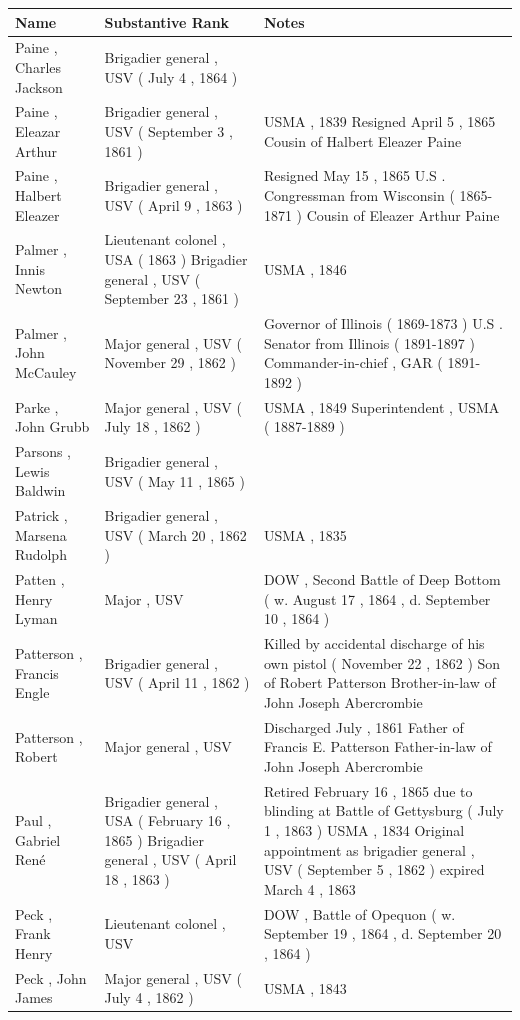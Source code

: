 \documentclass{article}
\begin{document}
\begin{tabular}{lll}
\toprule
Name & Substantive Rank & Notes \\
\midrule
Paine , Charles Jackson & Brigadier general , USV ( July 4 , 1864 ) &  \\
Paine , Eleazar Arthur & Brigadier general , USV ( September 3 , 1861 ) & USMA , 1839 Resigned April 5 , 1865 Cousin of Halbert Eleazer Paine \\
Paine , Halbert Eleazer & Brigadier general , USV ( April 9 , 1863 ) & Resigned May 15 , 1865 U.S . Congressman from Wisconsin ( 1865-1871 ) Cousin of Eleazer Arthur Paine \\
Palmer , Innis Newton & Lieutenant colonel , USA ( 1863 ) Brigadier general , USV ( September 23 , 1861 ) & USMA , 1846 \\
Palmer , John McCauley & Major general , USV ( November 29 , 1862 ) & Governor of Illinois ( 1869-1873 ) U.S . Senator from Illinois ( 1891-1897 ) Commander-in-chief , GAR ( 1891-1892 ) \\
Parke , John Grubb & Major general , USV ( July 18 , 1862 ) & USMA , 1849 Superintendent , USMA ( 1887-1889 ) \\
Parsons , Lewis Baldwin & Brigadier general , USV ( May 11 , 1865 ) &  \\
Patrick , Marsena Rudolph & Brigadier general , USV ( March 20 , 1862 ) & USMA , 1835 \\
Patten , Henry Lyman & Major , USV & DOW , Second Battle of Deep Bottom ( w. August 17 , 1864 , d. September 10 , 1864 ) \\
Patterson , Francis Engle & Brigadier general , USV ( April 11 , 1862 ) & Killed by accidental discharge of his own pistol ( November 22 , 1862 ) Son of Robert Patterson Brother-in-law of John Joseph Abercrombie \\
Patterson , Robert & Major general , USV & Discharged July , 1861 Father of Francis E. Patterson Father-in-law of John Joseph Abercrombie \\
Paul , Gabriel René & Brigadier general , USA ( February 16 , 1865 ) Brigadier general , USV ( April 18 , 1863 ) & Retired February 16 , 1865 due to blinding at Battle of Gettysburg ( July 1 , 1863 ) USMA , 1834 Original appointment as brigadier general , USV ( September 5 , 1862 ) expired March 4 , 1863 \\
Peck , Frank Henry & Lieutenant colonel , USV & DOW , Battle of Opequon ( w. September 19 , 1864 , d. September 20 , 1864 ) \\
Peck , John James & Major general , USV ( July 4 , 1862 ) & USMA , 1843 \\

\end{tabular}
\end{document}

